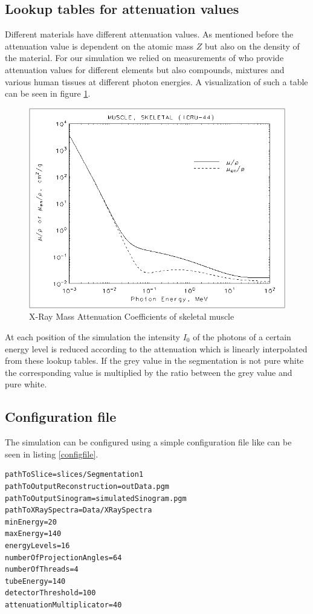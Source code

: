 \subsection{Lookup tables for attenuation values}
\par Different materials have different attenuation values. As mentioned before the attenuation value is dependent on the atomic mass \(Z\) but also on the density of the material. For our simulation we relied on measurements of \cite{AttenuationTable} who provide attenuation values for different elements but also compounds, mixtures and various human tissues at different photon energies. A visualization of such a table can be seen in figure \ref{muscleAtt}.
\begin{figure}[h!]
	\centering
	\includegraphics[width=0.5\linewidth]{images/muscle.png}
	\caption{X-Ray Mass Attenuation Coefficients of skeletal muscle\cite{AttenuationTable}}
	\label{muscleAtt}
\end{figure}
\par At each position of the simulation the intensity \(I_{0}\) of the photons of a certain energy level is reduced according to the attenuation which is linearly interpolated from these lookup tables. If the grey value in the segmentation is not pure white the corresponding value is multiplied by the ratio between the grey value and pure white.
\subsection{Configuration file}
\par The simulation can be configured using a simple configuration file like can be seen in listing \ref{configfile}.
\lstset{ %
  basicstyle=\footnotesize,
}
\begin{lstlisting}[caption={Sample configuration file},label=configfile,captionpos=b]
pathToSlice=slices/Segmentation1
pathToOutputReconstruction=outData.pgm
pathToOutputSinogram=simulatedSinogram.pgm
pathToXRaySpectra=Data/XRaySpectra
minEnergy=20
maxEnergy=140
energyLevels=16
numberOfProjectionAngles=64
numberOfThreads=4
tubeEnergy=140
detectorThreshold=100
attenuationMultiplicator=40
\end{lstlisting}
